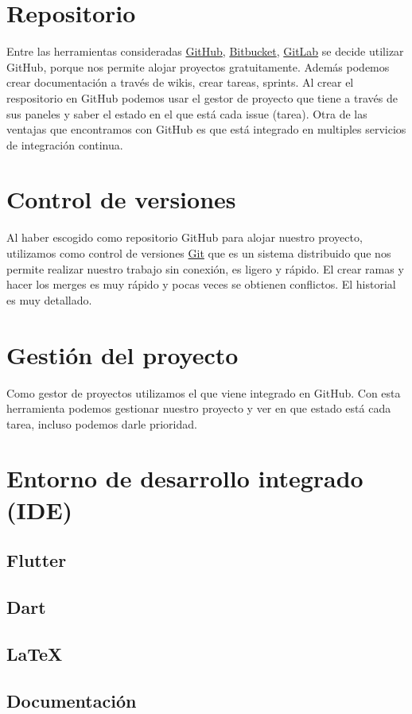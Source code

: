 
\section{Repositorio}
Entre las herramientas consideradas \href{https://github.com/}{GitHub}, \href{https://bitbucket.org/}{Bitbucket}, \href{https://about.gitlab.com/}{GitLab} se decide utilizar GitHub, porque nos permite alojar proyectos gratuitamente. Además podemos crear documentación a través de wikis, crear tareas, sprints.
Al crear el respositorio en GitHub podemos usar el gestor de proyecto que tiene a través de sus paneles y saber el estado en el que está cada issue (tarea).
Otra de las ventajas que encontramos con GitHub es que está integrado en multiples servicios de integración continua.
\section{Control de versiones}
Al haber escogido como repositorio GitHub para alojar nuestro proyecto, utilizamos como control de versiones \href{https://git-scm.com/}{Git} que es un sistema distribuido que nos permite realizar nuestro trabajo sin conexión, es ligero y rápido.
El crear ramas y hacer los merges es muy rápido y pocas veces se obtienen conflictos.
El historial es muy detallado.
\section{Gestión del proyecto}
Como gestor de proyectos utilizamos el que viene integrado en GitHub. Con esta herramienta podemos gestionar nuestro proyecto y ver en que estado está cada tarea, incluso podemos darle prioridad.
\section{Entorno de desarrollo integrado (IDE)}
\subsection{Flutter}
\subsection{Dart}
\subsection{LaTeX}
\subsection{Documentación}
